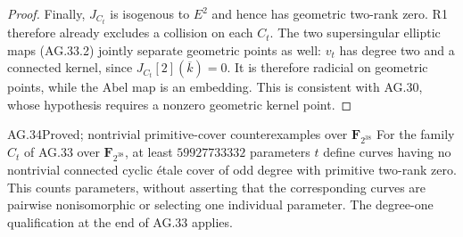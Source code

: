 \begin{proof}
Finally, $J_{C_t}$ is isogenous to $E^2$ and hence has
geometric two-rank zero. R1 therefore already excludes a
collision on each $C_t$. The two supersingular elliptic
maps (AG.33.2) jointly separate geometric points as well:
$v_t$ has degree two and a connected kernel, since
$J_{C_t}[2](\overline k)=0$. It is therefore radicial on
geometric points, while the Abel map is an
embedding. This is consistent with AG.30, whose hypothesis
requires a nonzero geometric kernel point.
\end{proof}

\begin{claim}{AG.34}{Proved; nontrivial primitive-cover counterexamples over $\mathbf F_{2^{38}}$}
For the family $C_t$ of AG.33 over $\mathbf F_{2^{38}}$,
at least $59927733332$ parameters $t$ define curves having
no nontrivial connected cyclic \'etale cover of odd degree
with primitive two-rank zero. This counts parameters,
without asserting that the corresponding curves are
pairwise nonisomorphic or selecting one individual parameter.
The degree-one qualification at the end of AG.33 applies.
\end{claim}
